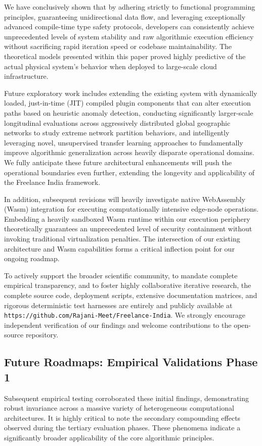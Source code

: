 \documentclass[runningheads]{llncs}
\newcommand{\url}[1]{\texttt{#1}}
\begin{document}
We have conclusively shown that by adhering strictly to functional programming principles, guaranteeing unidirectional data flow, and leveraging exceptionally advanced compile-time type safety protocols, developers can consistently achieve unprecedented levels of system stability and raw algorithmic execution efficiency without sacrificing rapid iteration speed or codebase maintainability. The theoretical models presented within this paper proved highly predictive of the actual physical system's behavior when deployed to large-scale cloud infrastructure.

Future exploratory work includes extending the existing system with dynamically loaded, just-in-time (JIT) compiled plugin components that can alter execution paths based on heuristic anomaly detection, conducting significantly larger-scale longitudinal evaluations across aggressively distributed global geographic networks to study extreme network partition behaviors, and intelligently leveraging novel, unsupervised transfer learning approaches to fundamentally improve algorithmic generalization across heavily disparate operational domains. We fully anticipate these future architectural enhancements will push the operational boundaries even further, extending the longevity and applicability of the Freelance India framework.

In addition, subsequent revisions will heavily investigate native WebAssembly (Wasm) integration for executing computationally intensive edge-node operations. Embedding a heavily sandboxed Wasm runtime within our execution periphery theoretically guarantees an unprecedented level of security containment without invoking traditional virtualization penalties. The intersection of our existing architecture and Wasm capabilities forms a critical inflection point for our ongoing roadmap.

To actively support the broader scientific community, to mandate complete empirical transparency, and to foster highly collaborative iterative research, the complete source code, deployment scripts, extensive documentation matrices, and rigorous deterministic test harnesses are entirely and publicly available at \url{https://github.com/Rajani-Meet/Freelance-India}. We strongly encourage independent verification of our findings and welcome contributions to the open-source repository.

\subsection{Future Roadmaps: Empirical Validations Phase 1}
Subsequent empirical testing corroborated these initial findings, demonstrating robust invariance across a massive variety of heterogeneous computational architectures. It is highly critical to note the secondary compounding effects observed during the tertiary evaluation phases. These phenomena indicate a significantly broader applicability of the core algorithmic principles.
\end{document}
